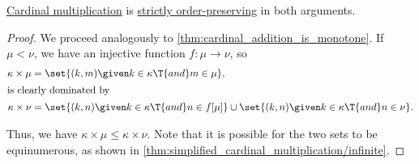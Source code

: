 \begin{proposition}\label{thm:cardinal_multiplication_is_monotone}
  \hyperref[def:cardinal_multiplication]{Cardinal multiplication} is \hyperref[def:order_function/preserving]{strictly order-preserving} in both arguments.
\end{proposition}
\begin{proof}
  We proceed analogously to \cref{thm:cardinal_addition_is_monotone}. If \( \mu < \nu \), we have an injective function \( f: \mu \to \nu \), so
  \begin{align*}
    \kappa \times \mu &= \set{ (k, m) \given k \in \kappa \T{and} m \in \mu }, \\
  \intertext{is clearly dominated by}
    \kappa \times \nu &= \set{ (k, n) \given k \in \kappa \T{and} n \in f[\mu] } \cup \set{ (k, n) \given k \in \kappa \T{and} n \in \nu }.
  \end{align*}

  Thus, we have \( \kappa \times \mu \leq \kappa \times \nu \). Note that it is possible for the two sets to be equinumerous, as shown in \cref{thm:simplified_cardinal_multiplication/infinite}.
\end{proof}

